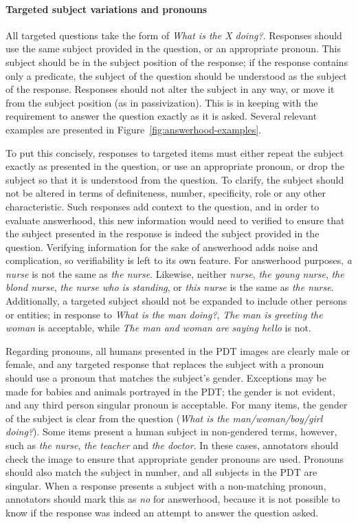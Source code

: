 \documentclass[12pt]{article}
\begin{document}
\paragraph{Targeted subject variations and pronouns}
All targeted questions take the form of \textit{What is the X doing?}. Responses should use the same subject provided in the question, or an appropriate pronoun. This subject should be in the subject position of the response; if the response contains only a predicate, the subject of the question should be understood as the subject of the response. Responses should not alter the subject in any way, or move it from the subject position (as in passivization). This is in keeping with the requirement to answer the question exactly as it is asked. Several relevant examples are presented in Figure~\ref{fig:answerhood-examples}.

To put this concisely, responses to targeted items must either repeat the subject exactly as presented in the question, or use an appropriate pronoun, or drop the subject so that it is understood from the question. To clarify, the subject should not be altered in terms of definiteness, number, specificity, role or any other characteristic. Such responses add context to the question, and in order to evaluate answerhood, this new information would need to verified to ensure that the subject presented in the response is indeed the subject provided in the question. Verifying information for the sake of answerhood adds noise and complication, so verifiability is left to its own feature. For answerhood purposes, \textit{a nurse} is not the same as \textit{the nurse}. Likewise, neither \textit{nurse}, \textit{the young nurse}, \textit{the blond nurse}, \textit{the nurse who is standing}, or \textit{this nurse} is the same as \textit{the nurse}. Additionally, a targeted subject should not be expanded to include other persons or entities; in response to \textit{What is the man doing?}, \textit{The man is greeting the woman} is acceptable, while \textit{The man and woman are saying hello} is not.

Regarding pronouns, all humans presented in the PDT images are clearly male or female, and any targeted response that replaces the subject with a pronoun should use a pronoun that matches the subject's gender. Exceptions may be made for babies and animals portrayed in the PDT; the gender is not evident, and any third person singular pronoun is acceptable. For many items, the gender of the subject is clear from the question (\textit{What is the man/woman/boy/girl doing?}). Some items present a human subject in non-gendered terms, however, such as \textit{the nurse}, \textit{the teacher} and \textit{the doctor}. In these cases, annotators should check the image to ensure that appropriate gender pronouns are used. Pronouns should also match the subject in number, and all subjects in the PDT are singular. When a response presents a subject with a non-matching pronoun, annotators should mark this as \textit{no} for answerhood, because it is not possible to know if the response was indeed an attempt to answer the question asked. 
\end{document}
